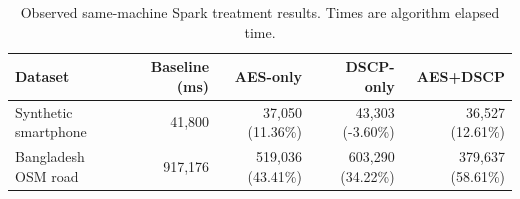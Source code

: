 \begin{table}[t]
\centering
\caption{Observed same-machine Spark treatment results. Times are algorithm elapsed time.}
\label{tab:spark-treatment-results}
\begin{tabular}{lrrrr}
\hline
Dataset & Baseline (ms) & AES-only & DSCP-only & AES+DSCP \\
\hline
Synthetic smartphone & 41,800 & 37,050 (11.36\%) & 43,303 (-3.60\%) & 36,527 (12.61\%) \\
Bangladesh OSM road & 917,176 & 519,036 (43.41\%) & 603,290 (34.22\%) & 379,637 (58.61\%) \\
\hline
\end{tabular}
\end{table}
